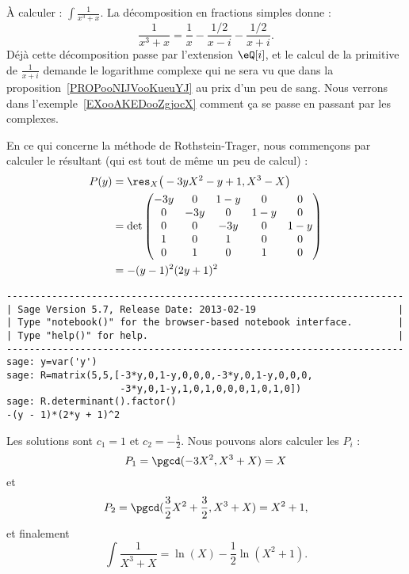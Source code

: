 \begin{example}     \label{EXooIPEQooGKDjea}
	À calculer : \( \int\frac{1}{ x^3+x }\). La décomposition en fractions simples donne :
	\begin{equation}
		\frac{1}{ x^3+x }= \frac{1}{ x }-\frac{ 1/2 }{ x-i }-\frac{ 1/2 }{ x+i }.
	\end{equation}
	Déjà cette décomposition passe par l'extension \( \eQ[i]\), et le calcul de la primitive de \( \frac{1}{ x+i }\) demande le logarithme complexe qui ne sera vu que dans la proposition~\ref{PROPooNIJVooKueuYJ} au prix d'un peu de sang.
	Nous verrons dans l'exemple~\ref{EXooAKEDooZgjocX} comment ça se passe en passant par les complexes.

	En ce qui concerne la méthode de Rothstein-Trager, nous commençons par calculer le résultant (qui est tout de même un peu de calcul) :
	\begin{subequations}
		\begin{align}
			P(y) & =\res_X\big( -3yX^2-y+1,X^3-X \big) \\
			     & =\det\begin{pmatrix}
				-3y & 0   & 1-y & 0   & 0   \\
				0   & -3y & 0   & 1-y & 0   \\
				0   & 0   & -3y & 0   & 1-y \\
				1   & 0   & 1   & 0   & 0   \\
				0   & 1   & 0   & 1   & 0
			\end{pmatrix}     \\
			     & =-(y-1)^2(2y+1)^2
		\end{align}
	\end{subequations}

	\begin{verbatim}
----------------------------------------------------------------------
| Sage Version 5.7, Release Date: 2013-02-19                         |
| Type "notebook()" for the browser-based notebook interface.        |
| Type "help()" for help.                                            |
----------------------------------------------------------------------
sage: y=var('y')
sage: R=matrix(5,5,[-3*y,0,1-y,0,0,0,-3*y,0,1-y,0,0,0,
                    -3*y,0,1-y,1,0,1,0,0,0,1,0,1,0])
sage: R.determinant().factor()
-(y - 1)*(2*y + 1)^2
    \end{verbatim}
	Les solutions sont \( c_1=1\) et \( c_2=-\frac{ 1 }{2}\). Nous pouvons alors calculer les \( P_i\) :
	\begin{equation}
		P_1=\pgcd(-3X^2,X^3+X)=X
	\end{equation}
	et
	\begin{equation}
		P_2=\pgcd(\frac{ 3 }{2}X^2+\frac{ 3 }{2},X^3+X)=X^2+1,
	\end{equation}
	et finalement
	\begin{equation}
		\int\frac{ 1 }{ X^3+X }=\ln(X)-\frac{ 1 }{2}\ln(X^2+1).
	\end{equation}
\end{example}

